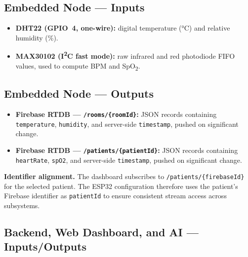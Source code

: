 \subsection*{Embedded Node — Inputs}

\begin{itemize}
	\item \textbf{DHT22\cite{dht22_datasheet} (GPIO~4, one-wire):} digital temperature (°C) and relative
	      humidity (\%).
	\item \textbf{MAX30102\cite{max30102_datasheet} (I\textsuperscript{2}C fast mode):} raw infrared
	      and red photodiode FIFO values, used to compute BPM and SpO\textsubscript{2}.
\end{itemize}

\subsection*{Embedded Node — Outputs}

\begin{itemize}
	\item \textbf{Firebase RTDB — \texttt{/rooms/\{roomId\}}:}
	      JSON records containing \texttt{temperature}, \texttt{humidity}, and
	      server-side \texttt{timestamp}, pushed on significant change.
	\item \textbf{Firebase RTDB — \texttt{/patients/\{patientId\}}:}
	      JSON records containing \texttt{heartRate}, \texttt{spO2}, and
	      server-side \texttt{timestamp}, pushed on significant change.
\end{itemize}

	\noindent\textbf{Identifier alignment.} The dashboard subscribes to
	\texttt{/patients/\{firebaseId\}} for the selected patient. The ESP32 configuration
	therefore uses the patient's Firebase identifier as \texttt{patientId} to ensure
	consistent stream access across subsystems.

\subsection*{Backend, Web Dashboard, and AI — Inputs/Outputs}

